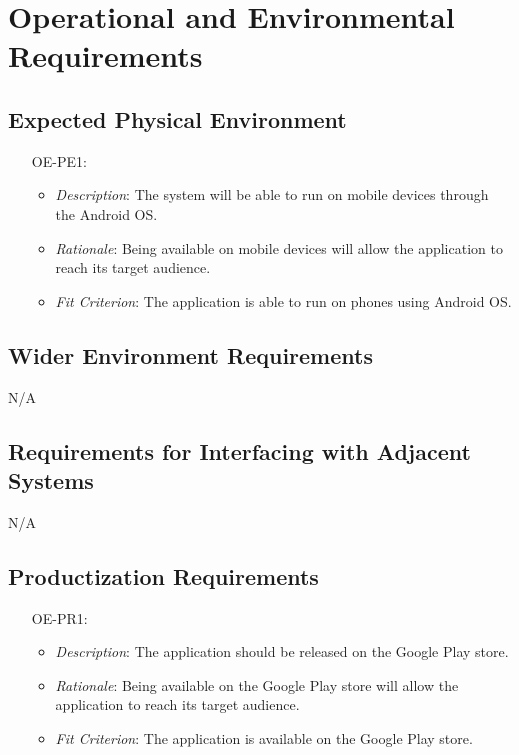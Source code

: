 \documentclass[12pt]{article}
\begin{document}
\section{Operational and Environmental Requirements}
\subsection{Expected Physical Environment}
\noindent \begin{itemize}
    \item[OE-PE1:] 
        \begin{itemize}
            \item \textit{Description}: The system will be able to run on mobile devices through the Android OS.
            \item \textit{Rationale}: Being available on mobile devices will allow the application to reach its target audience.
            \item \textit{Fit Criterion}: The application is able to run on phones using Android OS.
        \end{itemize}
\end{itemize}
\subsection{Wider Environment Requirements}
N/A
\subsection{Requirements for Interfacing with Adjacent Systems}

N/A

\subsection{Productization Requirements}
\noindent \begin{itemize}
    \item[OE-PR1:] 
        \begin{itemize}
            \item \textit{Description}: The application should be released on the Google Play store.
            \item \textit{Rationale}: Being available on the Google Play store will allow the application to reach its target audience.
            \item \textit{Fit Criterion}: The application is available on the Google Play store.
        \end{itemize}
\end{itemize}
\end{document}

